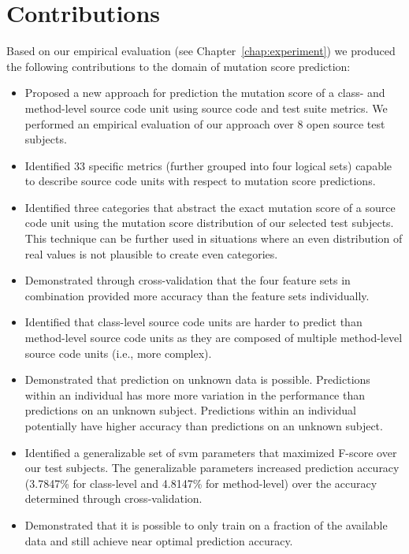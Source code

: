 \section{Contributions}
\label{sec:conclusions_contributions}
Based on our empirical evaluation (see Chapter~\ref{chap:experiment}) we produced the following contributions to the domain of mutation score prediction:

\begin{itemize}
  \item Proposed a new approach for prediction the mutation score of a class- and method-level source code unit using source code and test suite metrics. We performed an empirical evaluation of our approach over 8 open source test subjects.
  \item Identified 33 specific metrics (further grouped into four logical sets) capable to describe source code units with respect to mutation score predictions.
  \item Identified three categories that abstract the exact mutation score of a source code unit using the mutation score distribution of our selected test subjects. This technique can be further used in situations where an even distribution of real values is not plausible to create even categories.
  \item Demonstrated through cross-validation that the four feature sets in combination provided more accuracy than the feature sets individually.
  \item Identified that class-level source code units are harder to predict than method-level source code units as they are composed of multiple method-level source code units (i.e., more complex).
  \item Demonstrated that prediction on unknown data is possible. Predictions within an individual has more more variation in the performance than predictions on an unknown subject. Predictions within an individual potentially have higher accuracy than predictions on an unknown subject.
  \item Identified a generalizable set of \gls{svm} parameters that maximized F-score over our test subjects. The generalizable parameters increased prediction accuracy (3.7847\% for class-level and 4.8147\% for method-level) over the accuracy determined through cross-validation.
  \item Demonstrated that it is possible to only train on a fraction of the available data and still achieve near optimal prediction accuracy.
\end{itemize}

